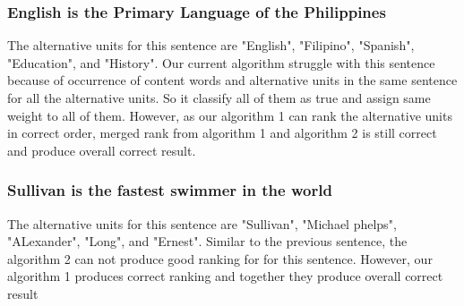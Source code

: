 \documentclass[11pt]{article}
\begin{document}
\subsubsection{English is the Primary Language of the Philippines}
The alternative units for this sentence are "English", "Filipino", "Spanish", "Education", and "History". Our current algorithm struggle with this sentence because of occurrence of content words and alternative units in the same sentence for all the alternative units. So it classify all of them as true and assign same weight to all of them. However, as our algorithm 1 can rank the alternative units in correct order, merged rank from algorithm 1 and algorithm 2 is still correct and produce overall correct result. 

\subsubsection{Sullivan is the fastest swimmer in the world}
The alternative units for this sentence are "Sullivan", "Michael phelps", "ALexander", "Long", and "Ernest". Similar to the previous sentence, the algorithm 2 can not produce good ranking for for this sentence. However, our algorithm 1 produces correct ranking and together they produce overall correct result







\end{document}
